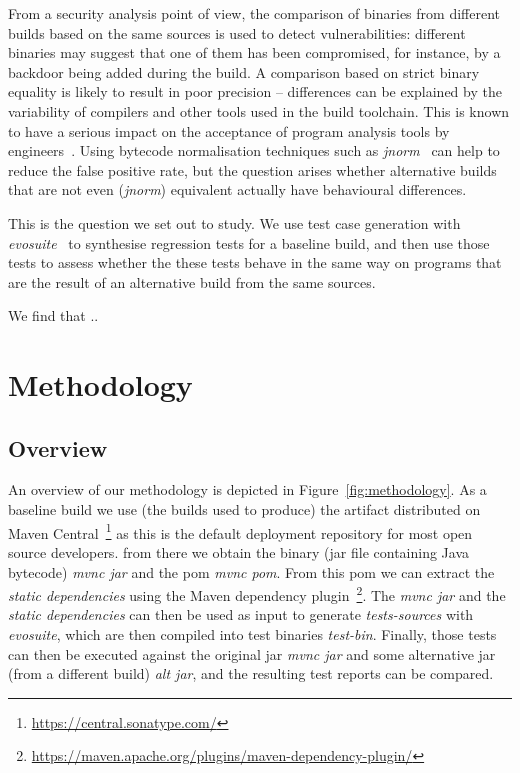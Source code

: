 \documentclass[conference]{IEEEtran}
\begin{document}
From a security analysis point of view, the comparison of binaries from different builds based on the same sources is used to detect vulnerabilities: different binaries may suggest that one of them has been compromised, for instance, by a backdoor being added during the build. A comparison based on strict binary equality is likely to result in poor precision -- differences can be explained by the variability of compilers and other tools used in the build toolchain. This is known to have a serious impact on the acceptance of program analysis tools by engineers~\cite{sadowski2018lessons,distefano2019scaling}. Using bytecode normalisation techniques such as \textit{jnorm}~\cite{schott2024JNorm} can help to reduce the false positive rate, but the question arises whether alternative builds that are not even (\textit{jnorm}) equivalent actually have behavioural differences.   

This is the question we set out to study. We use test case generation with \textit{evosuite}~\cite{fraser2011evosuite} to synthesise regression tests for a baseline build, and then use those tests to assess whether the these tests behave in the same way on programs that are the result of an alternative  build from the same sources. 

We find that .. 


\section{Methodology}

\subsection{Overview}

An overview of our methodology is depicted in Figure~\ref{fig:methodology}.  As a baseline build we use (the builds used to produce) the artifact distributed on Maven Central~\footnote{\url{https://central.sonatype.com/}} as this is the default deployment repository for most open source developers.  from there we obtain the binary (jar file containing Java bytecode) \textit{mvnc jar }and the pom \textit{mvnc pom}. From this pom we can extract the \textit{static dependencies} using the Maven dependency plugin~\footnote{\url{https://maven.apache.org/plugins/maven-dependency-plugin/}}.  The \textit{mvnc jar} and the \textit{static dependencies} can then be used as input to generate \textit{tests-sources} with \textit{evosuite}, which are then compiled into test binaries \textit{test-bin}.  Finally, those tests can then be executed against the original jar \textit{mvnc jar} and some alternative jar (from a different build) \textit{alt jar}, and the resulting test reports can be compared.
\end{document}
